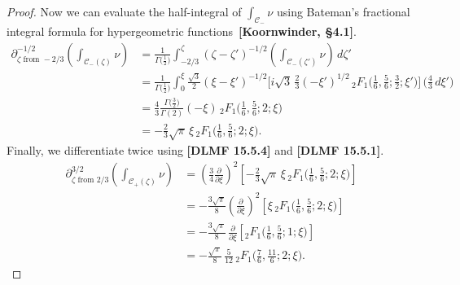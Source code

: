 \documentclass{article}
\begin{document}
\begin{proof}
Now we can evaluate the half-integral of $\int_{\mathcal{C}_-} \nu$ using Bateman's fractional integral formula for hypergeometric functions~\textbf{[Koornwinder, \S 4.1]}.
\begin{align*}
\partial^{-1/2}_{\zeta \text{ from } -2/3} \left( \int_{\mathcal{C}_-(\zeta)} \nu \right) & = \frac{1}{\Gamma\big(\tfrac{1}{2}\big)} \int_{-2/3}^\zeta (\zeta - \zeta')^{-1/2} \left( \int_{\mathcal{C}_-(\zeta')} \nu \right)\,d\zeta' \\
& = \frac{1}{\Gamma\big(\tfrac{1}{2}\big)} \int_0^\xi \tfrac{\sqrt{3}}{2} (\xi - \xi')^{-1/2} \Big[{i}{\sqrt{3}}\,\tfrac{2}{3} (-\xi')^{1/2}\, {}_2F_1\big(\tfrac{1}{6}, \tfrac{5}{6}; \tfrac{3}{2}; \xi' \big) \Big] \,\big( \tfrac{4}{3}\,d\xi' \big) \\
& =  \frac{4}{3} \frac{\Gamma\big(\tfrac{3}{2}\big)}{\Gamma(2)} (-\xi)\, {}_2F_1\big(\tfrac{1}{6}, \tfrac{5}{6}; 2; \xi\big) \\
& = - \frac{2}{3} \sqrt{\pi}\,\xi\,{}_2F_1\big(\tfrac{1}{6}, \tfrac{5}{6}; 2; \xi\big).
\end{align*}
Finally, we differentiate twice using \textbf{[DLMF 15.5.4]} and \textbf{[DLMF 15.5.1]}.
\begin{align*}
\partial^{3/2}_{\zeta \text{ from } 2/3} \left( \int_{\mathcal{C}_+(\zeta)} \nu \right) & = \left(\tfrac{3}{4} \tfrac{\partial}{\partial \xi}\right)^2 \left[ - \frac{2}{3} \sqrt{\pi}\,\xi\, {}_2F_1\big(\tfrac{1}{6}, \tfrac{5}{6}; 2; \xi\big) \right] \\
& = - \tfrac{3\sqrt{\pi}}{8} \left(\tfrac{\partial}{\partial \xi}\right)^2 \left[ \xi\, {}_2F_1\big(\tfrac{1}{6}, \tfrac{5}{6}; 2; \xi\big) \right] \\
& = - \tfrac{3\sqrt{\pi}}{8}\,\tfrac{\partial}{\partial \xi} \left[ {}_2F_1\big(\tfrac{1}{6}, \tfrac{5}{6}; 1; \xi\big) \right] \\
& = - \tfrac{\sqrt{\pi}}{8}\,\tfrac{5}{12}\, {}_2F_1\big(\tfrac{7}{6}, \tfrac{11}{6}; 2; \xi\big).
\end{align*}
\end{proof}



\end{document}
